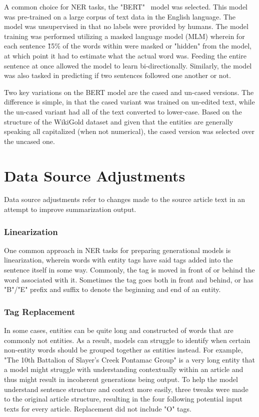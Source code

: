 \documentclass[12pt]{report}
\begin{document}
        A common choice for NER tasks, the "BERT"~\cite{BERT} model was selected. This model was pre-trained on a large corpus of text data in the English language. The model was unsupervised in that no labels were provided by humans. The model training was performed utilizing a masked language model (MLM) wherein for each sentence \~15\% of the words within were masked or "hidden" from the model, at which point it had to estimate what the actual word was. Feeding the entire sentence at once allowed the model to learn bi-directionally. Similarly, the model was also tasked in predicting if two sentences followed one another or not.
        
        Two key variations on the BERT model are the cased and un-cased versions. The difference is simple, in that the cased variant was trained on un-edited text, while the un-cased variant had all of the text converted to lower-case. Based on the structure of the WikiGold dataset and given that the entities are generally speaking all capitalized (when not numerical), the cased version was selected over the uncased one.

    \section{Data Source Adjustments}
        Data source adjustments refer to changes made to the source article text in an attempt to improve summarization output.
        
        \subsubsection{Linearization}
        One common approach in NER tasks for preparing generational models is linearization, wherein words with entity tags have said tags added into the sentence itself in some way. Commonly, the tag is moved in front of or behind the word associated with it. Sometimes the tag goes both in front and behind, or has "B"/"E" prefix and suffix to denote the beginning and end of an entity.
        
        \subsubsection{Tag Replacement}
        In some cases, entities can be quite long and constructed of words that are commonly not entities. As a result, models can struggle to identify when certain non-entity words should be grouped together as entities instead. For example, "The 10th Battalion of Slayer's Creek Pontamac Group" is a very long entity that a model might struggle with understanding contextually within an article and thus might result in incoherent generations being output. To help the model understand sentence structure and context more easily, three tweaks were made to the original article structure, resulting in the four following potential input texts for every article. Replacement did not include "O" tags.
            
\end{document}
